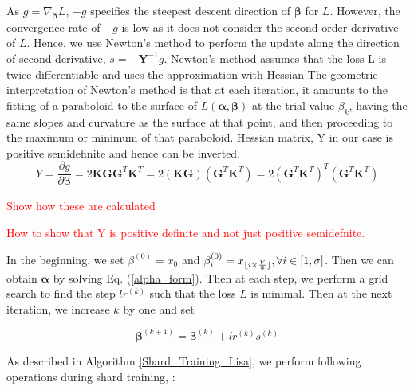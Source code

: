 As $g=\nabla_{\boldsymbol{\beta}} L$, $-g$ specifies the steepest descent direction of $\boldsymbol{\beta}$ for $L$. However, the convergence rate of $-g$ is low as it does not consider the second order derivative of $L$. Hence, we use Newton's method to perform the update along the direction of second derivative, $s=-\boldsymbol{Y}^{-1}g$. Newton's method assumes that the loss L is twice differentiable and uses the approximation with Hessian
The geometric interpretation of Newton's method is that at each iteration, it amounts to the fitting of a paraboloid to the surface of $L(\boldsymbol{\alpha},\boldsymbol{\beta})$  at the trial value $\beta_{k}$, having the same slopes and curvature as the surface at that point, and then proceeding to the maximum or minimum of that paraboloid. 
Hessian matrix, Y in our case is positive semidefinite and hence can be inverted. 
\begin{equation}
	Y=\frac{\partial g}{\partial \boldsymbol{\beta}}=2\boldsymbol{KGG}^T \boldsymbol{K}^T= 2 \boldsymbol{(KG)} (\boldsymbol{G}^T \boldsymbol{K}^T)=2 (\boldsymbol{G}^T \boldsymbol{K}^T)^T (\boldsymbol{G}^T \boldsymbol{K}^T)
\end{equation}

\textcolor{red}{Show how these are calculated}

\textcolor{red}{How to show that Y is positive definite and not just positive semidefnite.}  

In the beginning, we set $\beta^{(0)}=x_0$ and $\beta_i^{(0)}=x_{\lfloor i\times \frac{V}{\Psi}\rfloor}, \forall i\in[1,\sigma]$. Then we can obtain $\boldsymbol{\alpha}$ by solving Eq. (\ref{alpha_form}). Then at each step, we perform a grid search to find the step $lr^{(k)}$ such that the loss $L$ is minimal. Then at the next iteration, we increase $k$ by one and set 

$$
\boldsymbol{\beta}^{(k+1)}=\boldsymbol{\beta}^{(k)} + lr^{(k)}s^{(k)}
$$


As described in Algorithm \ref{Shard_Training_Lisa}, we perform  following operations during shard training, :

